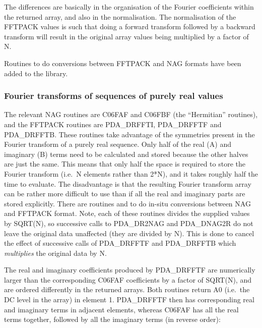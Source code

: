    The differences are basically in the organisation of the Fourier
   coefficients within the returned array, and also in the
   normalisation. The normalisation of the FFTPACK values is such that
   doing a forward transform followed by a backward transform will
   result in the original array values being multiplied by a factor of
   N.

   Routines to do conversions between FFTPACK and NAG formats have been
   added to the library.


\subsubsection{Fourier transforms of sequences of purely real values}

   The relevant NAG routines are C06FAF and C06FBF (the ``Hermitian''
   routines), and the FFTPACK routines are PDA\_DRFFTI, PDA\_DRFFTF and
   PDA\_DRFFTB.
   These routines take advantage of the symmetries present in the Fourier
   transform of a purely real sequence. Only half of the real (A) and
   imaginary (B) terms need to be calculated and stored because the
   other halves are just the same. This means that only half the space
   is required to store the Fourier transform (i.e.\ N elements rather
   than 2*N), and it takes roughly half the time to evaluate. The
   disadvantage is that the resulting Fourier transform array can be
   rather more difficult to use than if all the real and imaginary parts
   are stored explicitly. There are routines
 and 
   to do in-situ conversions between NAG and FFTPACK format. Note, each
   of these routines divides the supplied values by SQRT(N), so
   successive calls to PDA\_DR2NAG and PDA\_DNAG2R do not leave the
   original data
   unaffected (they are divided by N). This is done to cancel the effect
   of successive calls of PDA\_DRFFTF and PDA\_DRFFTB which {\em
   multiplies\/} the original data by N.

   The real and imaginary coefficients produced by PDA\_DRFFTF are
   numerically larger than the corresponding C06FAF coefficients by a
   factor of SQRT(N), and are ordered differently in the returned
   arrays. Both routines return A0 (i.e.\ the DC level in the array) in
   element 1. PDA\_DRFFTF then has corresponding real and imaginary terms in
   adjacent elements, whereas C06FAF has all the real terms together,
   followed by all the imaginary terms (in reverse order):

